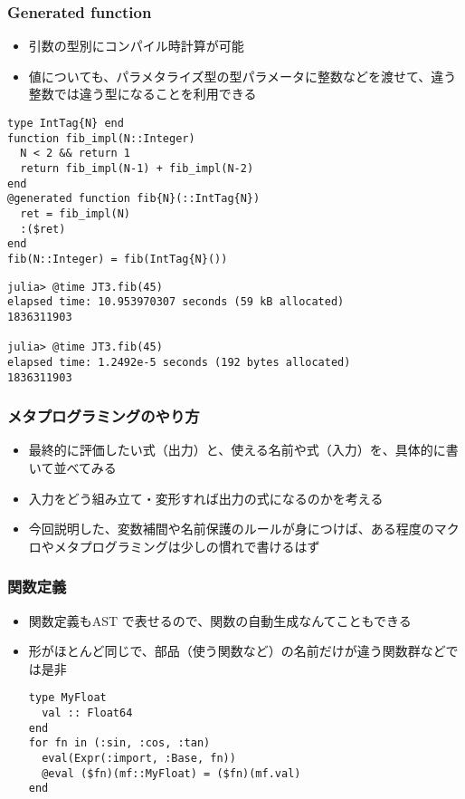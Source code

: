 \begin{frame}
\frametitle{Generated function}
\begin{itemize}
  \item 引数の型別にコンパイル時計算が可能
  \item 値についても、パラメタライズ型の型パラメータに整数などを渡せて、違う整数では違う型になることを利用できる
\end{itemize}
\begin{lstlisting}
type IntTag{N} end
function fib_impl(N::Integer)
  N < 2 && return 1
  return fib_impl(N-1) + fib_impl(N-2)
end
@generated function fib{N}(::IntTag{N})
  ret = fib_impl(N)
  :($ret)
end
fib(N::Integer) = fib(IntTag{N}())
\end{lstlisting}
\begin{lstlisting}
julia> @time JT3.fib(45)
elapsed time: 10.953970307 seconds (59 kB allocated)
1836311903

julia> @time JT3.fib(45)
elapsed time: 1.2492e-5 seconds (192 bytes allocated)
1836311903
\end{lstlisting}
\end{frame}

\begin{frame}[containsverbatim]
\frametitle{メタプログラミングのやり方}
\begin{itemize}
  \item 最終的に評価したい式（出力）と、使える名前や式（入力）を、具体的に書いて並べてみる
  \item 入力をどう組み立て・変形すれば出力の式になるのかを考える
  \item 今回説明した、変数補間や名前保護のルールが身につけば、ある程度のマクロやメタプログラミングは少しの慣れで書けるはず
\end{itemize}
\end{frame}

\begin{frame}[containsverbatim]
\frametitle{関数定義}
\begin{itemize}
  \item 関数定義もAST で表せるので、関数の自動生成なんてこともできる
  \item 形がほとんど同じで、部品（使う関数など）の名前だけが違う関数群などでは是非
\begin{lstlisting}
type MyFloat
  val :: Float64
end
for fn in (:sin, :cos, :tan)
  eval(Expr(:import, :Base, fn))
  @eval ($fn)(mf::MyFloat) = ($fn)(mf.val)
end
\end{lstlisting}
\end{itemize}
\end{frame}


